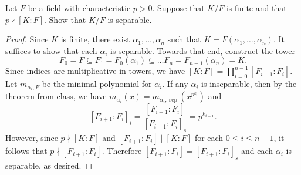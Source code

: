 \documentclass[10pt]{amsart}
\begin{document}
\begin{thm}
  Let $F$ be a field with characteristic $p > 0$.
  Suppose that $K/F$ is finite and that $p \nmid [K : F]$.
  Show that $K/F$ is separable.
  \begin{proof}
    Since $K$ is finite, there exist $\alpha_1, \ldots, \alpha_n$ such that $K = F(\alpha_1, \ldots, \alpha_n)$.
    It suffices to show that each $\alpha_i$ is separable.
    Towards that end, construct the tower 
    $$F_0 = F \subseteq F_1 = F_0(\alpha_1) \subseteq \ldots F_n = F_{n-1}(\alpha_{n}) = K.$$
    Since indices are multiplicative in towers, we have $[K:F] = \prod_{i=0}^{n-1} [F_{i+1} : F_i]$.
    Let $m_{\alpha_i, F}$ be the minimal polynomial for $\alpha_i$.
    If any $\alpha_i$ is inseparable, then by the theorem from class, we have $m_{\alpha_i}(x) = m_{\alpha_i, \operatorname{sep}}(x^{p^{k_{i}}})$ and
    $$[F_{i+1} : F_i]_i = \frac{[F_{i+1} : F_{i}]}{[F_{i+1} : F_i]_s} = p^{k_{i+1}}.$$
    However, since $p \nmid [K : F]$ and $[F_{i+1} : F_i] \mid [K : F]$ for each $0 \leq i \leq n-1$, it follows that $p \nmid [F_{i+1} : F_i]$.
    Therefore $[F_{i+1} : F_i] = [F_{i+1} : F_i]_s$ and each $\alpha_i$ is separable, as desired.
  \end{proof}
\end{thm}
\end{document}
